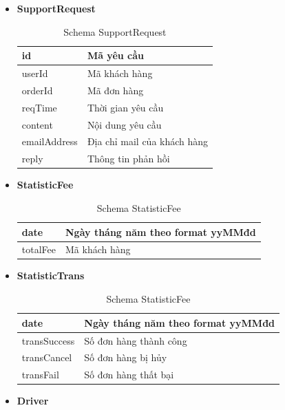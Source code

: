 \begin{itemize}
	
		\item \textbf{SupportRequest}
		
		\begin{table}[!htp]
			\centering\begin{tabular}{|l|m{30em}|}
				\hline 
				id & Mã yêu cầu\\
				\hline 
				userId & Mã khách hàng\\
				\hline 
				orderId & Mã đơn hàng\\ 
				\hline
				reqTime & Thời gian yêu cầu \\
				\hline 
				content & Nội dung yêu cầu \\
				\hline
				emailAddress & Địa chỉ mail của khách hàng \\
				\hline
				reply & Thông tin phản hồi \\
				\hline
			\end{tabular}
			\caption{Schema SupportRequest}
		\end{table}
	
		\item \textbf{StatisticFee}
		
		\begin{table}[!htp]
			\centering\begin{tabular}{|l|m{30em}|}
				\hline 
				date & Ngày tháng năm theo format yyMMđd\\
				\hline 
				totalFee & Mã khách hàng\\
				\hline 
			\end{tabular}
			\caption{Schema StatisticFee}
		\end{table}
	
	
		\item \textbf{StatisticTrans}
		
		\begin{table}[!htp]
			\centering\begin{tabular}{|l|m{30em}|}
				\hline 
				date & Ngày tháng năm theo format yyMMđd\\
				\hline 
				transSuccess & Số đơn hàng thành công\\
				\hline 
				transCancel & Số đơn hàng bị hủy\\
				\hline 
				transFail & Số đơn hàng thất bại\\
				\hline 
			\end{tabular}
			\caption{Schema StatisticFee}
		\end{table}
	
	\newpage
	
		\item \textbf{Driver}
		

\end{itemize}
